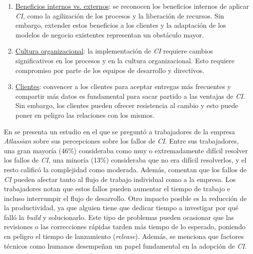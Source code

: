 \begin{enumerate}
	\item \underline{Beneficios internos vs. externos}: se reconocen los beneficios internos de
      aplicar \textit{CI}, como la agilización de los procesos y la liberación de recursos. Sin
      embargo, extender estos beneficios a los clientes y la adaptación de los modelos de negocio
      existentes representan un obstáculo mayor.
	\item \underline{Cultura organizacional}: la implementación de \textit{CI} requiere cambios
      significativos en los procesos y en la cultura organizacional. Esto requiere compromiso por
      parte de los equipos de desarrollo y directivos.
	\item \underline{Clientes}: convencer a los clientes para aceptar entregas más frecuentes y
      compartir más datos es fundamental para sacar partido a las ventajas de \textit{CI}. Sin
      embargo, los clientes pueden ofrecer resistencia al cambio y esto puede poner en peligro
      las relaciones con los mismos.
\end{enumerate}

En \cite{17} se presenta un estudio en el que se preguntó a trabajadores de la empresa
\textit{Atlassian} sobre sus percepciones sobre los fallos de \textit{CI}. Entre sus trabajadores,
una gran mayoría (46\%) consideraba como muy o extremadamente difícil resolver los fallos de
\textit{CI}, una minoría (13\%) consideraba que no era difícil resolverlos, y el resto calificó
la complejidad como moderada. Además, comentan que los fallos de \textit{CI} pueden afectar tanto
al flujo de trabajo individual como a la empresa. Los trabajadores notan que estos fallos pueden
aumentar el tiempo de trabajo e incluso interrumpir el flujo de desarrollo. Otro impacto posible
es la reducción de la productividad, ya que alguien tiene que dedicar tiempo a investigar por qué
falló la \textit{build} y solucionarlo. Este tipo de problemas pueden ocasionar que las revisiones
o las correcciones rápidas tarden más tiempo de lo esperado, poniendo en peligro el tiempo de
lanzamiento (\textit{release}). Además, se menciona que factores técnicos como humanos desempeñan
un papel fundamental en la adopción de \textit{CI}.\\

